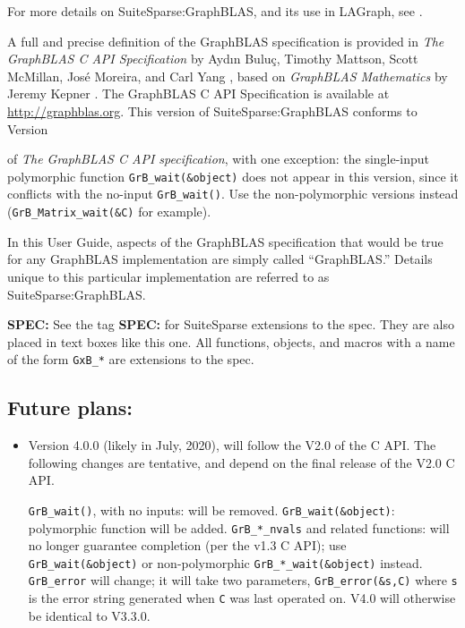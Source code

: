 \documentclass[12pt]{article}
\begin{document}

For more details on SuiteSparse:GraphBLAS, and its use in LAGraph, see
\cite{Davis18,Davis18b,DavisAznavehKolodziej19,Davis20,Mattson19}.

A full and precise
definition of the GraphBLAS specification is provided in {\em The GraphBLAS C
API Specification} by {Ayd\i n Bulu\c{c}, Timothy Mattson, Scott McMillan,
Jos\'e Moreira, and Carl Yang} \cite{BulucMattsonMcMillanMoreiraYang17,spec},
based on {\em GraphBLAS Mathematics} by Jeremy Kepner \cite{Kepner2017}.  The
GraphBLAS C API Specification is available at \url{http://graphblas.org}.  This
version of SuiteSparse:GraphBLAS conforms to Version

of {\em The GraphBLAS C API specification}, with one exception:
the single-input polymorphic function \verb'GrB_wait(&object)' does not appear
in this version, since it conflicts with the no-input \verb'GrB_wait()'.  Use
the non-polymorphic versions instead (\verb'GrB_Matrix_wait(&C)' for example).

In this User Guide, aspects of the GraphBLAS specification that would be true
for any GraphBLAS implementation are simply called ``GraphBLAS.'' Details
unique to this particular implementation are referred to as
SuiteSparse:GraphBLAS.

\begin{spec}
{\bf SPEC:} See the tag {\bf SPEC:} for SuiteSparse extensions to the spec.
They are also placed in text boxes like this one.  All functions, objects, and
macros with a name of the form \verb'GxB_*' are extensions to the spec.
\end{spec}

\newpage
\subsection{Future plans:}

\begin{itemize}

\item Version 4.0.0 (likely in July, 2020), will follow the V2.0 of the C API.
    The following changes are tentative, and depend on the final release of the
    V2.0 C API.

    \verb'GrB_wait()', with no inputs: will be removed.
    \verb'GrB_wait(&object)': polymorphic function will be added.
    \verb'GrB_*_nvals' and related functions:
        will no longer guarantee completion
        (per the v1.3 C API);
        use \verb'GrB_wait(&object)'
        or non-polymorphic \verb'GrB_*_wait(&object)' instead.
    \verb'GrB_error' will change; it will take two parameters,
    \verb'GrB_error(&s,C)' where \verb's' is the error string generated
    when \verb'C' was last operated on.
    V4.0 will otherwise be identical to V3.3.0.

\end{itemize}
\end{document}

